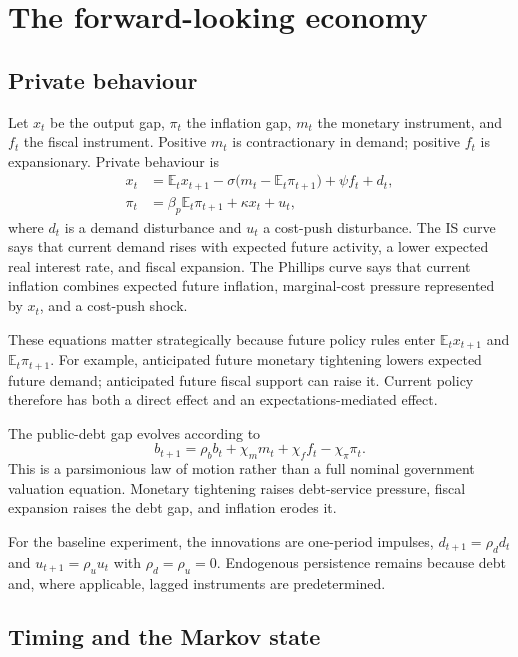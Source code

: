 \documentclass[11pt]{article}
\newcommand{\E}{\mathbb{E}}
\begin{document}
\section{The forward-looking economy}
\label{sec:model}

\subsection{Private behaviour}

Let $x_t$ be the output gap, $\pi_t$ the inflation gap, $m_t$ the monetary
instrument, and $f_t$ the fiscal instrument. Positive $m_t$ is contractionary
in demand; positive $f_t$ is expansionary. Private behaviour is
\begin{align}
x_t &= \E_t x_{t+1}
       -\sigma\bigl(m_t-\E_t\pi_{t+1}\bigr)
       +\psi f_t+d_t,                                      \label{eq:is}\\
\pi_t &= \beta_p\E_t\pi_{t+1}+\kappa x_t+u_t,              \label{eq:pc}
\end{align}
where $d_t$ is a demand disturbance and $u_t$ a cost-push disturbance. The IS
curve says that current demand rises with expected future activity, a lower
expected real interest rate, and fiscal expansion. The Phillips curve says
that current inflation combines expected future inflation, marginal-cost
pressure represented by $x_t$, and a cost-push shock.

These equations matter strategically because future policy rules enter
$\E_t x_{t+1}$ and $\E_t\pi_{t+1}$. For example, anticipated future monetary
tightening lowers expected future demand; anticipated future fiscal support
can raise it. Current policy therefore has both a direct effect and an
expectations-mediated effect.

The public-debt gap evolves according to
\begin{equation}
b_{t+1}=\rho_b b_t+\chi_m m_t+\chi_f f_t-\chi_\pi\pi_t.
\label{eq:debt}
\end{equation}
This is a parsimonious law of motion rather than a full nominal government
valuation equation. Monetary tightening raises debt-service pressure, fiscal
expansion raises the debt gap, and inflation erodes it.

For the baseline experiment, the innovations are one-period impulses,
$d_{t+1}=\rho_d d_t$ and $u_{t+1}=\rho_u u_t$ with
$\rho_d=\rho_u=0$. Endogenous persistence remains because debt and, where
applicable, lagged instruments are predetermined.

\subsection{Timing and the Markov state}
\end{document}
